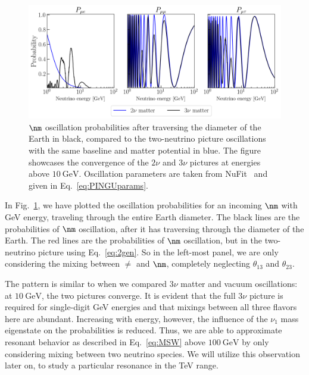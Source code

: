 \begin{figure}
    \centering
    \includegraphics[width=1\textwidth]{figures/2_vs_3.png}
    \caption{$\nm$ oscillation probabilities after traversing the diameter of the Earth in black, 
    compared to the two-neutrino picture oscillations with the same 
    baseline and matter potential in blue. The figure showcases the convergence of the $2\nu$ and $3\nu$ pictures at energies above $\SI{10}{\GeV}$.
    Oscillation parameters are taken from NuFit~\cite{nufit} and given in Eq.~\ref{eq:PINGUparams}.}\label{fig:2_vs_3}
\end{figure}

In Fig.~\ref{fig:2_vs_3}, we have plotted the oscillation probabilities for an incoming $\nm$ with \si{\GeV} energy,
traveling through the entire Earth diameter. The black lines are the probabilities of $\nm$ oscillation, after it has traversing through the diameter of the Earth.
The red lines are the probabilities of $\nm$ oscillation, but in the two-neutrino picture using Eq.~\ref{eq:2gen}. So in the left-most panel,
we are only considering the mixing between $\ne$ and $\nm$, completely neglecting $\theta_{13}$ and $\theta_{23}$.

The pattern is similar to when we compared $3\nu$ matter and vacuum oscillations: at $\SI{10}{\GeV}$, the two pictures converge.
It is evident that the full $3\nu$ picture is required for single-digit \si{\GeV} energies and that mixings between all three flavors here are 
abundant. Increasing with energy, however, the influence of the $\nu_1$ mass eigenstate on the probabilities is reduced.
Thus, we are able to approximate resonant behavior as described in Eq.~\ref{eq:MSW} above $\SI{100}{\GeV}$ by only considering 
mixing between two neutrino species. We will utilize this observation later on, to study a particular resonance in the \si{\TeV} range.